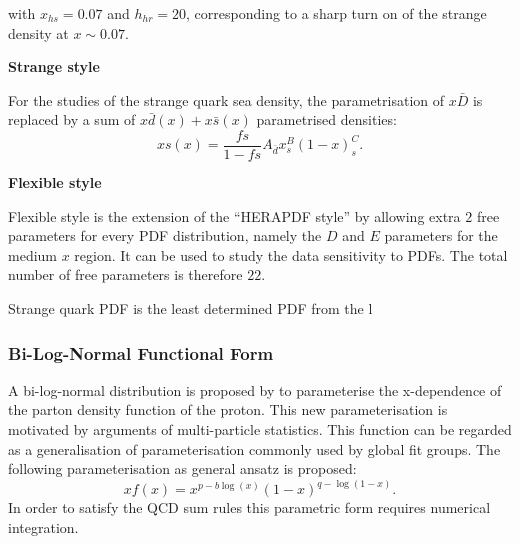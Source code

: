 \begin{description}
with $x_{hs} = 0.07$ and $h_{hr} = 20$, corresponding to a sharp turn on of the strange density at $x\sim 0.07$.

\item \bf{Strange style}\rm


For the studies of the strange quark sea density, the parametrisation of $x\bar{D}$ is replaced by a sum of $x\bar{d}(x)+x\bar{s}(x)$ parametrised densities:
\begin{equation}
xs(x)=\frac{fs}{1-fs} A_{\bar{d}}x^B_s(1-x)^C_s .
\end{equation}

\item \bf{Flexible style}\rm

Flexible style is the extension of the ``HERAPDF style'' by allowing  extra $2$ free parameters for every PDF distribution, namely the $D$ and $E$ parameters for the medium $x$ region. It can be used to study the data sensitivity to PDFs. The total number of free parameters is therefore $22$.




Strange quark PDF is the least determined PDF from the l
\end{description}

\subsubsection{Bi-Log-Normal Functional Form}
\label{sec:log}
A bi-log-normal distribution is proposed by \cite{AndreSchoening} to parameterise the x-dependence of the parton density function of the proton.
This new parameterisation
is motivated by arguments of multi-particle statistics. 
This function can be regarded as a generalisation of parameterisation commonly used by global fit groups.
The following parameterisation as general ansatz is proposed:
\begin{equation}
xf(x)=x^{p-b\log(x)}(1-x)^{q-\log(1-x)}.
\label{eq:AS}
\end{equation}
In order to satisfy the QCD sum rules this parametric form requires numerical integration.

